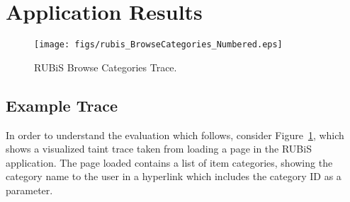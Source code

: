 \documentclass[msc,oneside]{ubcthesis}
\begin{document}


\section{Application Results}

\begin{figure}[ht]
  \begin{center}
    \texttt{[image: figs/rubis\_BrowseCategories\_Numbered.eps]}
    \caption[RUBiS Browse Categories Trace]{\label{fig:browsecategories} RUBiS Browse Categories Trace.}
  \end{center}
\end{figure}

\subsection{Example Trace}
\label{sec:example}
In order to understand the evaluation which follows, consider Figure~\ref{fig:browsecategories}, which shows a visualized taint trace taken from loading a page in the RUBiS application. The page loaded contains a list of item categories, showing the category name to the user in a hyperlink which includes the category ID as a parameter. 
\end{document}
